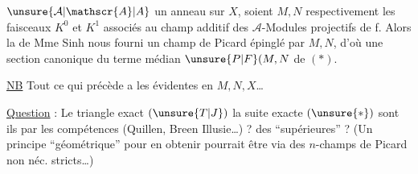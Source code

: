 
\uline{}\unsure{:|,}  $\unsure{\mathcal{A}|\mathscr{A}|A}$ un anneau sur $X$, soient $M,N$ respectivement les faisceaux $K^{0}$ et $K^{1}$ associés au champ additif des $\mathcal{A}$-Modules projectifs de  f.  Alors la  de Mme Sinh nous fourni un champ de Picard épinglé par $M,N$, d'où une section  canonique du terme médian $\unsure{P|F}(M,N$ de $(*)$.

\uline{NB} Tout ce qui précède a les  évidentes en $M,N,X$\ldots

\uline{Question} : Le triangle exact $(\unsure{T|J})$  la suite exacte $(\unsure{*})$ sont ils  par les compétences (Quillen, Breen Illusie\ldots) ?  des  ``supérieures'' ? (Un principe ``géométrique'' pour en obtenir pourrait être via des $n$-champs de Picard non néc. stricts\ldots)

